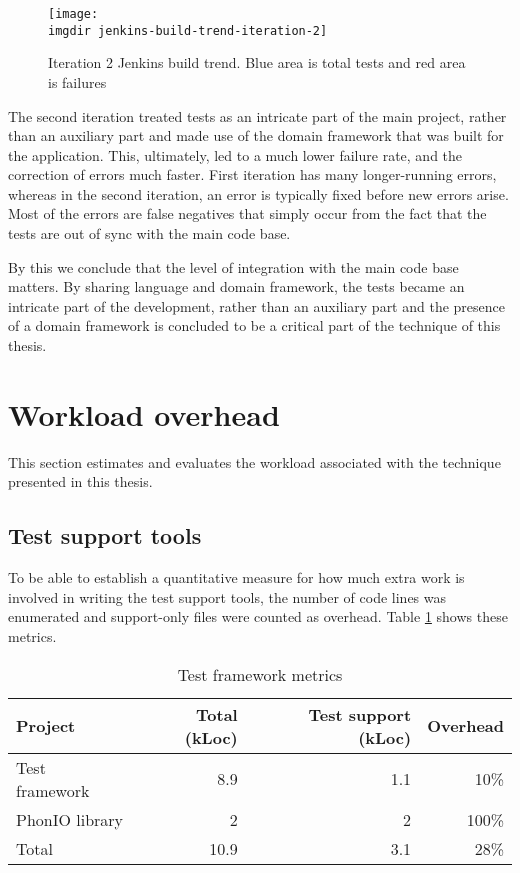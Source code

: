 \begin{figure}[!hbpt]
\centering
\texttt{[image: \\imgdir jenkins-build-trend-iteration-2]}
\caption{Iteration 2 Jenkins build trend. Blue area is total tests and red area is failures}
\label{fig:jenkins-build-trend-iteration-2}
\end{figure}

\noindent The second iteration treated tests as an intricate part of the main project, rather than an auxiliary part and made use of the domain framework that was built for the application. This, ultimately, led to a much lower failure rate, and the correction of errors much faster. First iteration has many longer-running errors, whereas in the second iteration, an error is typically fixed before new errors arise. Most of the errors are false negatives that simply occur from the fact that the tests are out of sync with the main code base.\bigskip

\noindent By this we conclude that the level of integration with the main code base matters. By sharing language and domain framework, the tests became an intricate part of the development, rather than an auxiliary part and the presence of a domain framework is concluded to be a critical part of the technique of this thesis.

\section{Workload overhead}
\label{sec:workload overhead}
This section estimates and evaluates the workload associated with the technique presented in this thesis.
\subsection{Test support tools}
To be able to establish a quantitative measure for how much extra work is involved in writing the test support tools, the number of code lines was enumerated and support-only files were counted as overhead. Table \ref{tab:loc-metrics} shows these metrics.\medskip

\begin{table}[!htbp]
\centering
\begin{tabular}{ | l | r | r | r |}
   \hline
   Project        & Total (kLoc) & Test support (kLoc) & Overhead \\ \hline
   Test framework & 8.9          & 1.1                 & 10\%     \\
   PhonIO library & 2            & 2                   & 100\%    \\
   \hline
   \hline
   Total          & 10.9         & 3.1                 & 28\%     \\
   \hline
\end{tabular}
\caption{Test framework metrics}
\label{tab:loc-metrics}
\end{table}

